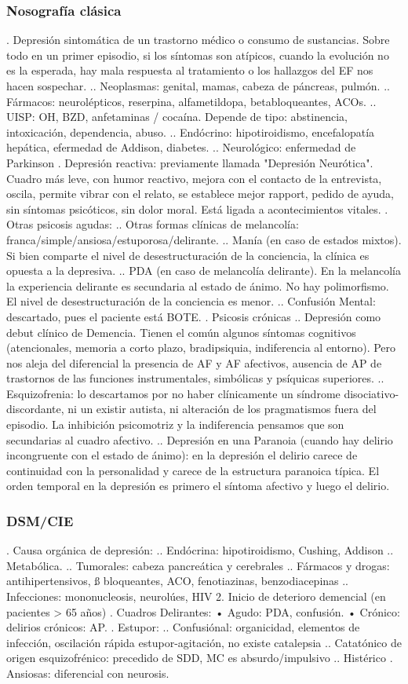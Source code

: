 \subsubsection*{Nosografía clásica}
. Depresión sintomática de un trastorno médico o consumo de sustancias. Sobre todo en un primer episodio, si los síntomas son atípicos, cuando la evolución no es la esperada, hay mala respuesta al tratamiento o los hallazgos del EF nos hacen sospechar.
.. Neoplasmas: genital, mamas, cabeza de páncreas, pulmón.
.. Fármacos: neurolépticos, reserpina, alfametildopa, betabloqueantes, ACOs.
.. UISP: OH, BZD, anfetaminas / cocaína. Depende de tipo: abstinencia, intoxicación, dependencia, abuso.
.. Endócrino: hipotiroidismo, encefalopatía hepática, efermedad de Addison, diabetes.
.. Neurológico: enfermedad de Parkinson
. Depresión reactiva: previamente llamada "Depresión Neurótica". Cuadro más leve, con humor reactivo, mejora con el  contacto de la entrevista, oscila, permite vibrar con el relato, se establece mejor rapport, pedido de ayuda, sin síntomas psicóticos, sin dolor moral. Está ligada a acontecimientos vitales.
. Otras psicosis agudas:
.. Otras formas clínicas de melancolía: franca/simple/ansiosa/estuporosa/delirante.
.. Manía (en caso de estados mixtos). Si bien comparte el nivel de desestructuración de la conciencia, la clínica es opuesta a la depresiva.
.. PDA (en caso de melancolía delirante). En la melancolía la experiencia delirante es secundaria al estado de ánimo. No hay polimorfismo. El nivel de desestructuración de la conciencia es menor.
.. Confusión Mental: descartado, pues el paciente está BOTE.
. Psicosis crónicas
.. Depresión como debut clínico de Demencia. Tienen el común algunos síntomas cognitivos (atencionales, memoria a corto plazo, bradipsiquia, indiferencia al entorno). Pero nos aleja del diferencial la presencia de AF y AF afectivos, ausencia de AP de trastornos de las funciones instrumentales, simbólicas y psíquicas superiores.
.. Esquizofrenia: lo descartamos por no haber clínicamente un síndrome disociativo-discordante, ni un existir autista, ni alteración de los pragmatismos fuera del episodio. La inhibición psicomotriz y la indiferencia pensamos que son secundarias al cuadro afectivo.
.. Depresión en una Paranoia (cuando hay delirio incongruente con el estado de ánimo): en la depresión el delirio carece de continuidad con la personalidad y carece de la estructura paranoica típica. El orden temporal en la depresión es primero el síntoma afectivo y luego el delirio.
\subsubsection*{DSM/CIE}
. Causa orgánica de depresión:
.. Endócrina: hipotiroidismo, Cushing, Addison
.. Metabólica.
.. Tumorales: cabeza pancreática y cerebrales
.. Fármacos y drogas: antihipertensivos, ß bloqueantes, ACO, fenotiazinas, benzodiacepinas
.. Infecciones: mononucleosis, neurolúes, HIV 2. Inicio de deterioro demencial (en pacientes > 65 años)
. Cuadros Delirantes: • Agudo: PDA, confusión. • Crónico: delirios crónicos: AP.
. Estupor:
.. Confusiónal: organicidad, elementos de infección, oscilación rápida estupor-agitación, no existe catalepsia
.. Catatónico de origen esquizofrénico: precedido de SDD, MC es absurdo/impulsivo
.. Histérico
. Ansiosas: diferencial con neurosis.

